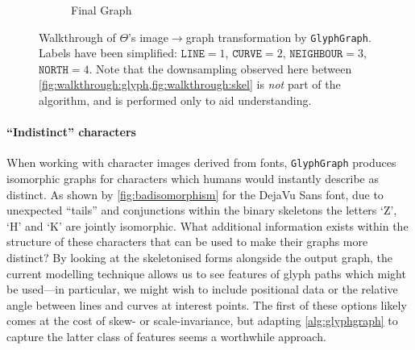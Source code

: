 \documentclass{mpaper}
\begin{document}
\begin{figure}
\begin{subfigure}[t]{0.3\linewidth}
{
		}
		\caption{Final Graph\label{fig:walkthrough:graph}}
	\end{subfigure}

	\vspace{0.5em}

	\caption{
		Walkthrough of $\Theta$'s image$\rightarrow$graph transformation by \texttt{GlyphGraph}.
		Labels have been simplified: $\mathtt{LINE}=1$, $\mathtt{CURVE}=2$, $\mathtt{NEIGHBOUR}=3$, $\mathtt{NORTH}=4$.
		Note that the downsampling observed here between \cref{fig:walkthrough:glyph,fig:walkthrough:skel} is \emph{not} part of the algorithm, and is performed only to aid understanding.
		\label{fig:walkthrough}}
\end{figure}

\paragraph{``Indistinct'' characters}
When working with character images derived from fonts, \texttt{GlyphGraph} produces isomorphic graphs for characters which humans would instantly describe as distinct.
As shown by \cref{fig:badisomorphism} for the DejaVu Sans font, due to unexpected ``tails'' and conjunctions within the binary skeletons the letters `Z', `H' and `K' are jointly isomorphic.
What additional information exists within the structure of these characters that can be used to make their graphs more distinct?
By looking at the skeletonised forms alongside the output graph, the current modelling technique allows us to see features of glyph paths which might be used---in particular, we might wish to include positional data or the relative angle between lines and curves at interest points.
The first of these options likely comes at the cost of skew- or scale-invariance, but adapting \cref{alg:glyphgraph} to capture the latter class of features seems a worthwhile approach.
\end{document}
